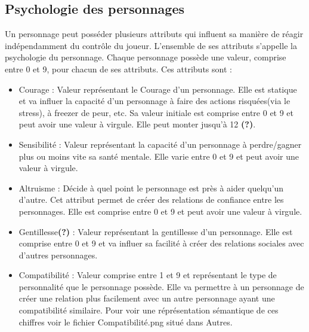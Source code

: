 \subsection{Psychologie des personnages}
Un personnage peut posséder plusieurs attributs qui influent sa manière de réagir indépendamment du contrôle du joueur. L'ensemble de ses attributs s'appelle la psychologie du personnage. Chaque personnage possède une valeur, comprise entre 0 et 9, pour chacun de ses attributs. Ces attributs sont :
\begin{itemize}
  \item Courage : Valeur représentant le Courage d'un personnage. Elle est statique et va influer la capacité d'un personnage à faire des actions risquées(via le stress), à freezer de peur, etc. Sa valeur initiale est comprise entre 0 et 9 et peut avoir une valeur à virgule. Elle peut monter jusqu'à 12 \textbf{(?)}.
  \item Sensibilité : Valeur représentant la capacité d'un personnage à perdre/gagner plus ou moins vite sa santé mentale. Elle varie entre 0 et 9 et peut avoir une valeur à virgule.
  \item Altruisme : Décide à quel point le personnage est près à aider quelqu'un d'autre. Cet attribut permet de créer des relations de confiance entre les personnages. Elle est comprise entre 0 et 9 et peut avoir une valeur à virgule.
  \item Gentillesse\textbf{(?)} : Valeur représentant la gentillesse d'un personnage. Elle est comprise entre 0 et 9 et va influer sa facilité à créer des relations sociales avec d'autres personnages.
  \item Compatibilité : Valeur comprise entre 1 et 9 et représentant le type de personnalité que le personnage possède. Elle va permettre à un personnage de créer une relation plus facilement avec un autre personnage ayant une compatibilité similaire. Pour voir une réprésentation sémantique de ces chiffres voir le fichier Compatibilité.png situé dans Autres.
\end{itemize} 
